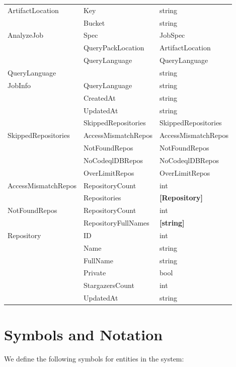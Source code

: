 \documentclass[11pt]{article}
\begin{document}
\begin{longtable}{|p{5cm}|p{5cm}|p{5cm}|}
\hline
ArtifactLocation & Key & string \\
& Bucket & string \\

\hline
AnalyzeJob & Spec & JobSpec \\
& QueryPackLocation & ArtifactLocation \\
& QueryLanguage & QueryLanguage \\

\hline
QueryLanguage &  & string \\

\hline
JobInfo & QueryLanguage & string \\
& CreatedAt & string \\
& UpdatedAt & string \\
& SkippedRepositories & SkippedRepositories \\

\hline
SkippedRepositories & AccessMismatchRepos & AccessMismatchRepos \\
& NotFoundRepos & NotFoundRepos \\
& NoCodeqlDBRepos & NoCodeqlDBRepos \\
& OverLimitRepos & OverLimitRepos \\

\hline
AccessMismatchRepos & RepositoryCount & int \\
& Repositories & \textbf{[Repository]} \\

\hline
NotFoundRepos & RepositoryCount & int \\
& RepositoryFullNames & \textbf{[string]} \\

\hline
Repository & ID & int \\
& Name & string \\
& FullName & string \\
& Private & bool \\
& StargazersCount & int \\
& UpdatedAt & string \\

\end{longtable}


\section{Symbols and Notation}
\label{sec:orgb695d5a}

We define the following symbols for entities in the system:
\end{document}
